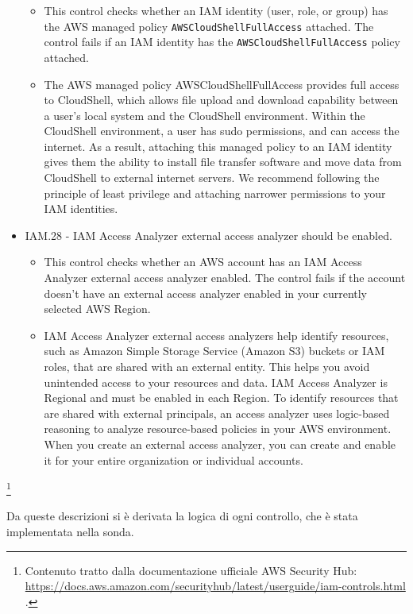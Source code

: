 \begin{mdframed}[backgroundcolor=gray!05, linecolor=gray!50]
\begin{itemize}
\begin{itemize}
        \item This control checks whether an IAM identity (user, role, or group) has the AWS managed policy \texttt{AWSCloudShellFullAccess} attached. The control fails if an IAM identity has the \texttt{AWSCloudShellFullAccess} policy attached.
        \item The AWS managed policy AWSCloudShellFullAccess provides full access to CloudShell, which allows file upload and download capability between a user's local system and the CloudShell environment. Within the CloudShell environment, a user has sudo permissions, and can access the internet. As a result, attaching this managed policy to an IAM identity gives them the ability to install file transfer software and move data from CloudShell to external internet servers. We recommend following the principle of least privilege and attaching narrower permissions to your IAM identities.
    \end{itemize}
    \item IAM.28 - IAM Access Analyzer external access analyzer should be enabled.
    \begin{itemize}
        \item This control checks whether an AWS account has an IAM Access Analyzer external access analyzer enabled. The control fails if the account doesn't have an external access analyzer enabled in your currently selected AWS Region.
        \item IAM Access Analyzer external access analyzers help identify resources, such as Amazon Simple Storage Service (Amazon S3) buckets or IAM roles, that are shared with an external entity. This helps you avoid unintended access to your resources and data. IAM Access Analyzer is Regional and must be enabled in each Region. To identify resources that are shared with external principals, an access analyzer uses logic-based reasoning to analyze resource-based policies in your AWS environment. When you create an external access analyzer, you can create and enable it for your entire organization or individual accounts.
    \end{itemize}
\end{itemize}
\end{mdframed}
\footnote{Contenuto tratto dalla documentazione ufficiale AWS Security Hub: \url{https://docs.aws.amazon.com/securityhub/latest/userguide/iam-controls.html} .}

Da queste descrizioni si è derivata la logica di ogni controllo, che è stata implementata nella sonda. 

